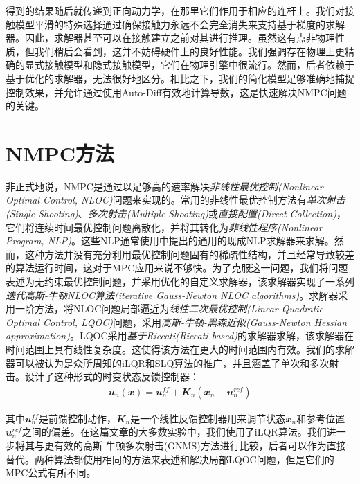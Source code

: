 得到的结果随后就传递到正向动力学，在那里它们作用于相应的连杆上。我们对接触模型平滑的特殊选择通过确保接触力永远不会完全消失来支持基于梯度的求解器。因此，求解器甚至可以在接触建立之前对其进行推理。虽然这有点非物理性质，但我们稍后会看到，这并不妨碍硬件上的良好性能。我们强调存在物理上更精确的显式接触模型\cite[p]{Azad_Featherstone_2014}和隐式接触模型，它们在物理引擎中很流行。然而，后者依赖于基于优化的求解器，无法很好地区分。相比之下，我们的简化模型足够准确地捕捉控制效果，并允许通过使用Auto-Diff有效地计算导数，这是快速解决NMPC问题的关键\cite[p]{Giftthaler_Neunert_Stäuble_Frigerio_Semini_Buchli_2017}。

\section[NMPC方法]{NMPC方法}

非正式地说，NMPC是通过以足够高的速率解决\emph{非线性最优控制(Nonlinear Optimal Control, NLOC)}问题来实现的。常用的非线性最优控制方法有\emph{单次射击(Single Shooting)}、\emph{多次射击(Multiple Shooting)}或\emph{直接配置(Direct Collection)}\cite[p]{Diehl_Bock_Diedam_Wieber_2005}，它们将连续时间最优控制问题离散化，并将其转化为\emph{非线性程序(Nonlinear Program, NLP)}。这些NLP通常使用\cite[p]{Posa_Kuindersma_Tedrake_2016, Pardo_Moller_Neunert_Winkler_Buchli_2016}中提出的通用的现成NLP求解器来求解。然而，这种方法并没有充分利用最优控制问题固有的稀疏性结构，并且经常导致较差的算法运行时间，这对于MPC应用来说不够快。为了克服这一问题，我们将问题表述为无约束最优控制问题，并采用优化的自定义求解器，该求解器实现了一系列\emph{迭代高斯-牛顿NLOC算法(iterative Gauss-Newton NLOC algorithms)}\cite[p]{Giftthaler_Neunert_Stäuble_Buchli_Diehl_2017}。求解器采用一阶方法，将NLOC问题局部逼近为\emph{线性二次最优控制(Linear Quadratic Optimal Control, LQOC)}问题，采用\emph{高斯-牛顿-黑森近似(Gauss-Newton Hessian approximation)}。LQOC采用\emph{基于Riccati(Riccati-based)}的求解器求解，该求解器在时间范围上具有线性复杂度。这使得该方法在更大的时间范围内有效。我们的求解器可以被认为是众所周知的iLQR\cite[p]{Todorov_Weiwei_Li_2005}和SLQ\cite[p]{Sideris_Bobrow_2005}算法的推广，并且涵盖了单次和多次射击。设计了这种形式的时变状态反馈控制器：
\begin{align}
    \mathbfit{u}_n(\mathbfit{x})=\mathbfit{u}_n^{ff}+\mathbfit{K}_n(\mathbfit{x}_n-\mathbfit{u}_n^{rcf})\label{function:time_vary_feedback_controller}
\end{align}

其中$\mathbfit{u}_n^{ff}$是前馈控制动作，$\mathbfit{K}_n$是一个线性反馈控制器用来调节状态$\mathbfit{x}_n$和参考位置$\mathbfit{u}_n^{rcf}$之间的偏差。在这篇文章\cite[p3]{Neunert_Stauble_Giftthaler_Bellicoso_Carius_Gehring_Hutter_Buchli_2018}的大多数实验中，我们使用了iLQR算法。我们进一步将其与更有效的高斯-牛顿多次射击(GNMS)方法进行比较，后者可以作为直接替代。两种算法都使用相同的方法来表述和解决局部LQOC问题，但是它们的MPC公式有所不同。

